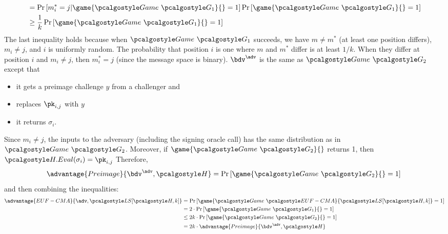 \begin{enumerate}
\begin{align*}
        &= \pr{m^*_i = j | \game{\Game~\algo{G_1}}{} = 1} \pr{\game{\Game~\algo{G_1}}{} = 1} \\
        &\geq \frac{1}{k}\pr{\game{\Game~\algo{G_1}}{} = 1} \\
    \end{align*}
    The last inequality holds because when $\Game~\algo{G_1}$ succeeds, we have $m \neq m^*$ (at least one position differs), $m_i \neq j$, and $i$ is uniformly random. The probability that position $i$ is one where $m$ and $m^*$ differ is at least $1/k$. When they differ at position $i$ and $m_i \neq j$, then $m^*_i = j$ (since the message space is binary).
    $\bdv^\adv$ is the same as $\Game~\algo{G_2}$ except that
    \begin{itemize}
        \item it gets a preimage challenge $y$ from a challenger and
        \item replaces $\pk_{i, j}$ with $y$
        \item it returns $\sigma_i$.
    \end{itemize}
    Since $m_i \neq j$, the inputs to the adversary (including the signing oracle call) has the same distribution as in $\Game~\algo{G_2}$.
    Moreover, if $\game{\Game~\algo{G_2}}{}$ returns 1, then $\algo{H.Eval}(\sigma_i) = \pk_{i, j}$
    Therefore,
    \[
    \advantage{Preimage}{\bdv^\adv, \algo{H}} = \pr{\game{\Game~\algo{G_2}}{} = 1} \\
    \]
    and then combining the inequalities:
    \begin{align*}
      \advantage{EUF-CMA}{\adv, \algo{LS}[\algo{H, k}]} &= \pr{\game{\Game~\algo{EUF-CMA}}{\algo{LS[\algo{H}, k]}} = 1} \\
      &= 2 \cdot \pr{\game{\Game~\algo{G_1}}{} = 1} \\
      &\leq 2k \cdot \pr{\game{\Game~\algo{G_2}}{} = 1} \\
      &= 2k \cdot \advantage{Preimage}{\bdv^\adv, \algo{H}}
    \end{align*}
\end{enumerate}

